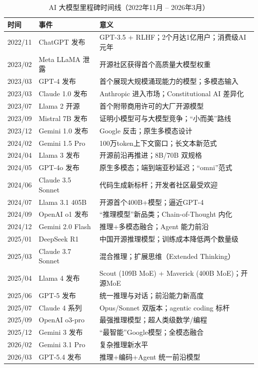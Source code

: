 \begin{table}[htbp]
\centering
\caption{AI 大模型里程碑时间线（2022年11月 -- 2026年3月）}
\label{tab:milestone-timeline}
\small
\begin{tabularx}{\textwidth}{l l X}
\toprule
\rowcolor{figLightGray}
\textbf{时间} & \textbf{事件} & \textbf{意义} \\
\midrule
2022/11 & ChatGPT 发布
  & GPT-3.5 + RLHF；2个月达1亿用户；消费级AI元年 \\
\rowcolor{figLightGray}
2023/02 & Meta LLaMA 泄露
  & 开源社区获得首个高质量大模型权重 \\
2023/03 & GPT-4 发布
  & 首个展现大规模涌现能力的模型；多模态输入 \\
\rowcolor{figLightGray}
2023/03 & Claude 1.0 发布
  & Anthropic 进入市场；Constitutional AI 差异化 \\
2023/07 & Llama 2 开源
  & 首个附带商用许可的大厂开源模型 \\
\rowcolor{figLightGray}
2023/09 & Mistral 7B 发布
  & 证明小模型可与大模型竞争；``小而美''路线 \\
2023/12 & Gemini 1.0 发布
  & Google 反击；原生多模态设计 \\
\rowcolor{figLightGray}
2024/02 & Gemini 1.5 Pro
  & 100万token上下文窗口；长文本新范式 \\
2024/04 & Llama 3 发布
  & 开源前沿再推进；8B/70B 双规格 \\
\rowcolor{figLightGray}
2024/05 & GPT-4o 发布
  & 原生多模态；端到端亚秒延迟；``omni''范式 \\
2024/06 & Claude 3.5 Sonnet
  & 代码生成新标杆；开发者社区最受欢迎 \\
\rowcolor{figLightGray}
2024/07 & Llama 3.1 405B
  & 开源首个400B+模型；逼近GPT-4 \\
2024/09 & OpenAI o1 发布
  & ``推理模型''新品类；Chain-of-Thought 内化 \\
\rowcolor{figLightGray}
2024/12 & Gemini 2.0 Flash
  & 推理+多模态融合；Agent 能力前沿 \\
2025/01 & DeepSeek R1
  & 中国开源推理模型；训练成本降低两个数量级 \\
\rowcolor{figLightGray}
2025/03 & Claude 3.7 Sonnet
  & 混合推理；扩展思维（Extended Thinking） \\
2025/04 & Llama 4 发布
  & Scout (109B MoE) + Maverick (400B MoE)；开源MoE \\
\rowcolor{figLightGray}
2025/06 & GPT-5 发布
  & 统一推理与对话；前沿能力新高度 \\
2025/07 & Claude 4 系列
  & Opus/Sonnet 双版本；agentic coding 标杆 \\
\rowcolor{figLightGray}
2025/09 & OpenAI o3-pro
  & 最强推理模型；超人类级数学/编程 \\
2025/12 & Gemini 3 发布
  & ``最智能''Google模型；全模态融合 \\
\rowcolor{figLightGray}
2026/02 & Gemini 3.1 Pro
  & 复杂推理新水平 \\
2026/03 & GPT-5.4 发布
  & 推理+编码+Agent 统一前沿模型 \\
\bottomrule
\end{tabularx}


\end{table}
